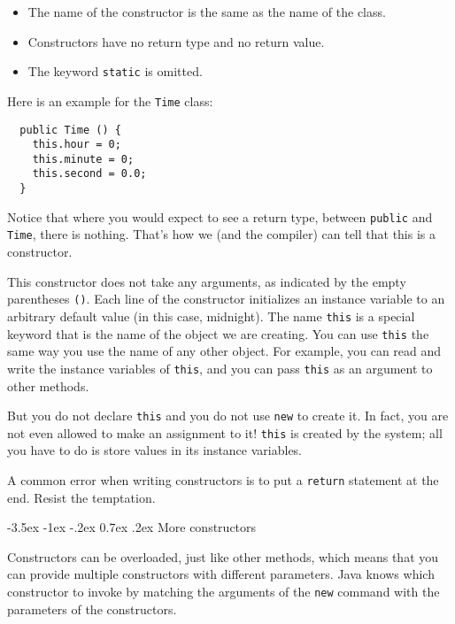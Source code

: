 \documentclass{book}
\makeatletter
\renewcommand{\section}{\@startsection 
    {section} {1} {0mm}%
    {-3.5ex \@plus -1ex \@minus -.2ex}%
    {0.7ex \@plus.2ex}%
    {\normalfont\Large\bfseries}}
\makeatother
\begin{document}
\begin{itemize}

\item The name of the constructor is the same as the name of
the class.

\item Constructors have no return type and no return value.

\item The keyword {\tt static} is omitted.

\end{itemize}

Here is an example for the {\tt Time} class:

\begin{verbatim}
  public Time () {
    this.hour = 0;
    this.minute = 0;
    this.second = 0.0;
  }
\end{verbatim}
%
Notice that where you would expect to see a return type,
between {\tt public} and {\tt Time}, there is nothing.  That's
how we (and the compiler) can tell that this is a constructor.

This constructor does not take any arguments, as indicated by the
empty parentheses {\tt ()}.  Each line of the constructor initializes
an instance variable to an arbitrary default value (in this case,
midnight).  The name {\tt this} is a special
keyword that is the name of the object we are creating.  You can use
{\tt this} the same way you use the name of any other object.  For
example, you can read and write the instance variables of {\tt this},
and you can pass {\tt this} as an argument to other methods.


But you do not declare {\tt this} and you do not use {\tt new}
to create it.  In fact, you are not even allowed to make an
assignment to it!  {\tt this} is created by the system; all you
have to do is store values in its instance variables.

A common error when writing constructors is to put a {\tt return}
statement at the end.  Resist the temptation.

\section{More constructors}

Constructors can be overloaded, just like other methods,
which means that you can provide multiple constructors
with different parameters.  Java knows which constructor
to invoke by matching the arguments of the {\tt new}
command with the parameters of the constructors.
\end{document}
